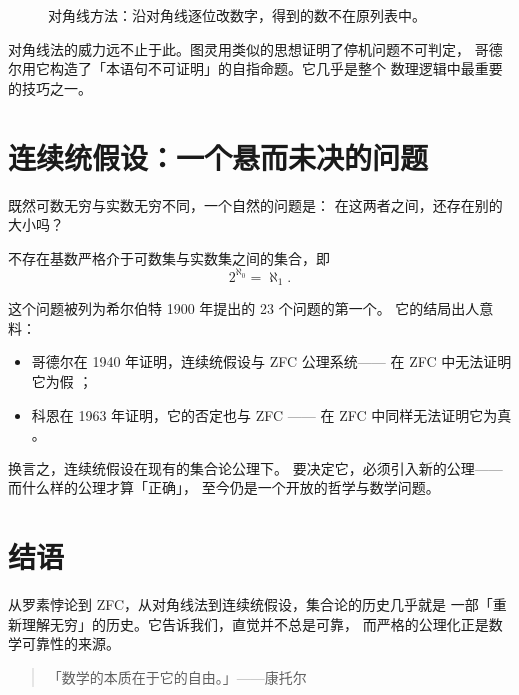\begin{figure}[htbp]
  \centering
  \caption{对角线方法：沿对角线逐位改数字，得到的数不在原列表中。}
\end{figure}

对角线法的威力远不止于此。图灵用类似的思想证明了停机问题不可判定，
哥德尔用它构造了「本语句不可证明」的自指命题。它几乎是整个
数理逻辑中最重要的技巧之一。

\section{连续统假设：一个悬而未决的问题}

既然可数无穷与实数无穷不同，一个自然的问题是：
在这两者之间，还存在别的大小吗？

\begin{conjecture}[连续统假设]
不存在基数严格介于可数集与实数集之间的集合，即
\[
  2^{\aleph_0}=\aleph_1.
\]
\end{conjecture}

这个问题被列为希尔伯特 1900 年提出的 23 个问题的第一个。
它的结局出人意料：

\begin{itemize}
  \item 哥德尔在 1940 年证明，连续统假设与 ZFC 公理系统——
  在 ZFC 中无法证明它为假 \cite{godel1940}；
  \item 科恩在 1963 年证明，它的否定也与 ZFC ——
  在 ZFC 中同样无法证明它为真 \cite{cohen1963}。
\end{itemize}

换言之，连续统假设在现有的集合论公理下。
要决定它，必须引入新的公理——而什么样的公理才算「正确」，
至今仍是一个开放的哲学与数学问题。

\section{结语}

从罗素悖论到 ZFC，从对角线法到连续统假设，集合论的历史几乎就是
一部「重新理解无穷」的历史。它告诉我们，直觉并不总是可靠，
而严格的公理化正是数学可靠性的来源。

\begin{quote}
「数学的本质在于它的自由。」——康托尔
\end{quote}
